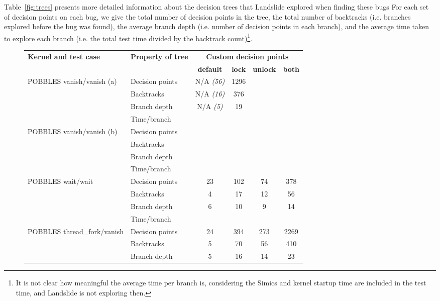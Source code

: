 
Table~\ref{fig:trees} presents more detailed information about the decision trees that Landslide explored when finding these bugs
For each set of decision points on each bug, we give the total number of decision points in the tree, the total number of backtracks (i.e. branches explored before the bug was found), the average branch depth (i.e. number of decision points in each branch), and the average time taken to explore each branch (i.e. the total test time divided by the backtrack count)\footnote{
It is not clear how meaningful the average time per branch is, considering the Simics and kernel startup time are included in the test time, and Landslide is not exploring then.}.

\newcommand\nobug[1]{N/A {\em \small (#1)}}
\begin{figure*}[t!]
	\begin{tabular}{|l|l||c|c|c|c|}
		\hline
		\multirow{2}{*}{\bf Kernel and test case} & \multirow{2}{*}{\bf Property of tree} & \multicolumn{4}{|c|}{\bf Custom decision points} \\
		\cline{3-6}
		& & \bf default & \bf lock & \bf unlock & \bf both \\
		\hline\hline
		\multirow{4}{*}{POBBLES vanish/vanish (a)} & Decision points & \nobug{56} & 1296 & & \\
		& Backtracks   & \nobug{16} & 376 & & \\
		& Branch depth & \nobug{5} & 19 & & \\
		& Time/branch  & & & & \\
		\hline
		\multirow{4}{*}{POBBLES vanish/vanish (b)} & Decision points & & & & \\
		& Backtracks   & & & & \\
		& Branch depth & & & & \\
		& Time/branch  & & & & \\
		\hline
		\multirow{4}{*}{POBBLES wait/wait} & Decision points & 23 & 102 & 74 & 378 \\
		& Backtracks   & 4 & 17 & 12 & 56 \\
		& Branch depth & 6 & 10 & 9 & 14 \\
		& Time/branch  & & & & \\
		\hline
		\multirow{4}{*}{POBBLES thread\_fork/vanish} & Decision points & 24 & 394 & 273 & 2269 \\
		& Backtracks   & 5 & 70 & 56 & 410 \\
		& Branch depth & 5 & 16 & 14 & 23 \\

\end{tabular}
\end{figure*}
